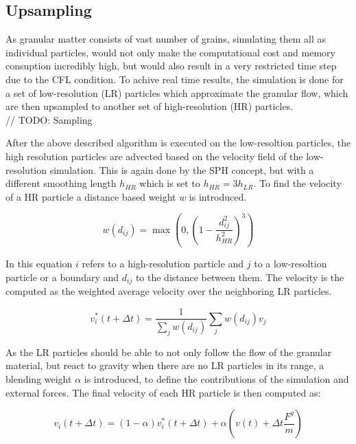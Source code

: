 \documentclass[intern]{cgMA}
\begin{document}
    \subsection{Upsampling}
    As granular matter consists of vast number of grains, simulating them all as individual particles, would not only make the computational cost and memory consuption incredibly high, but would also result in a very restricted time step due to the CFL condition. To achive real time results, the simulation is done for a set of low-resolution (LR) particles which approximate the granular flow, which are then upsampled to another set of high-resolution (HR) particles. \cite{10.2312:PE:vriphys:vriphys12:053-060}
    \\// TODO: Sampling

    After the above described algorithm is executed on the low-resoltion particles, the high resolution particles are advected based on the velocity field of the low-resolution simulation. This is again done by the SPH concept, but with a different smoothing length $h_{HR}$ which is set to $h_{HR} = 3h_{LR}$. To find the velocity of a HR particle a distance based weight $w$ is introduced.

    \begin{equation}
        w(d_{ij}) = \max(0, (1 - \frac{d_{ij}^2}{h_{HR}^2})^3)
    \end{equation}

    In this equation $i$ refers to a high-resolution particle and $j$ to a low-resoltion particle or a boundary and $d_{ij}$ to the distance between them. The velocity is the computed as the weighted average velocity over the neighboring LR particles.\cite{10.2312:PE:vriphys:vriphys12:053-060}

    \begin{equation}
        v_i^*(t + \Delta t) = \frac{1}{\sum_j w(d_{ij})}\sum_j w(d_{ij})v_j
    \end{equation}

    As the LR particles should be able to not only follow the flow of the granular material, but react to gravity when there are no LR particles in its range, a blending weight $\alpha$ is introduced, to define the contributions of the simulation and external forces. The final velocity of each HR particle is then computed as:

    \begin{equation}
        v_i(t + \Delta t)  = (1 - \alpha)v_i^*(t + \Delta t) + \alpha(v(t) + \Delta t \frac{F^g}{m})
    \end{equation}
\end{document}
